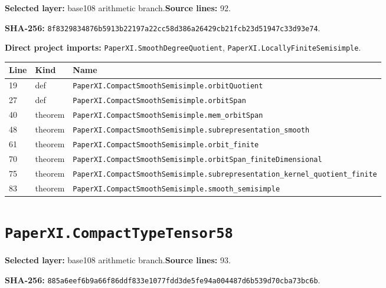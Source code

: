 \documentclass[10pt,oneside]{book}
\begin{document}
\textbf{Selected layer:} base108 arithmetic branch.\quad\textbf{Source lines:} 92.\par\textbf{SHA-256:} {\scriptsize\nolinkurl{8f8329834876b5913b22197a22cc58d386a26429cb21fcb23d51947c33d93e74}}.


\textbf{Direct project imports:} \nolinkurl{PaperXI.SmoothDegreeQuotient}, \nolinkurl{PaperXI.LocallyFiniteSemisimple}.

\begin{longtable}{@{}p{}p{}p{}@{}}\toprule Line&Kind&Name\\\midrule\endhead

19&def&\nolinkurl{PaperXI.CompactSmoothSemisimple.orbitQuotient}\\

27&def&\nolinkurl{PaperXI.CompactSmoothSemisimple.orbitSpan}\\

40&theorem&\nolinkurl{PaperXI.CompactSmoothSemisimple.mem_orbitSpan}\\

48&theorem&\nolinkurl{PaperXI.CompactSmoothSemisimple.subrepresentation_smooth}\\

61&theorem&\nolinkurl{PaperXI.CompactSmoothSemisimple.orbit_finite}\\

70&theorem&\nolinkurl{PaperXI.CompactSmoothSemisimple.orbitSpan_finiteDimensional}\\

75&theorem&\nolinkurl{PaperXI.CompactSmoothSemisimple.subrepresentation_kernel_quotient_finite}\\

83&theorem&\nolinkurl{PaperXI.CompactSmoothSemisimple.smooth_semisimple}\\

\bottomrule\end{longtable}

\section{\texorpdfstring{\nolinkurl{PaperXI.CompactTypeTensor58}}{PaperXI.CompactTypeTensor58}}\label{module:PaperXI.CompactTypeTensor58}

\textbf{Selected layer:} base108 arithmetic branch.\quad\textbf{Source lines:} 93.\par\textbf{SHA-256:} {\scriptsize\nolinkurl{885a6eef6b9a66f86ddf833e1077fdd3de5fe94a004487d6b539d70cba73bc6b}}.
\end{document}
